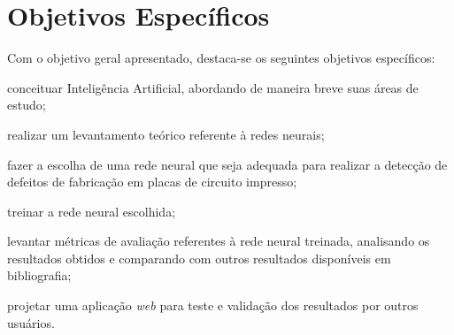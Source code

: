 \section{Objetivos Específicos}

Com o objetivo geral apresentado, destaca-se os seguintes objetivos específicos:

\begin{alineas}
  \item conceituar Inteligência Artificial, abordando de maneira breve suas áreas de estudo;
  \item realizar um levantamento teórico referente à redes neurais;
  \item fazer a escolha de uma rede neural que seja adequada para realizar  a detecção de defeitos de fabricação em placas de circuito impresso;
  \item treinar a rede neural escolhida;
  \item levantar métricas de avaliação referentes à rede neural treinada, analisando os resultados obtidos e comparando com outros resultados disponíveis em bibliografia;
  \item projetar uma aplicação \textit{web} para teste e validação dos resultados por outros usuários.
\end{alineas}
